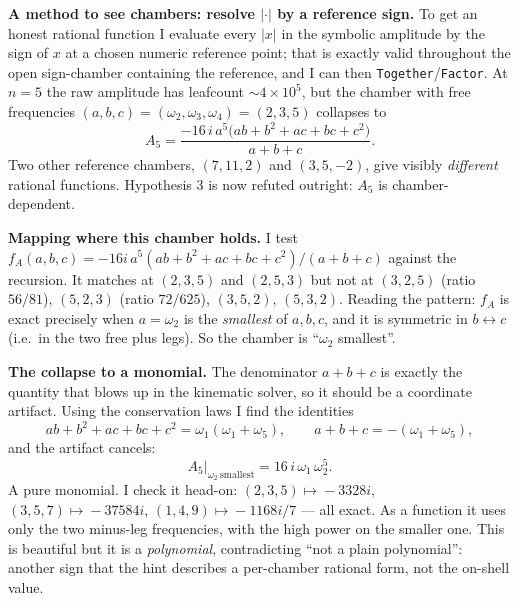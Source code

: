 \documentclass[11pt]{article}
\begin{document}
\medskip
\noindent\textbf{A method to see chambers: resolve $|\cdot|$ by a reference sign.}
To get an honest rational function I evaluate every $|x|$ in the symbolic amplitude by the
sign of $x$ at a chosen numeric reference point; that is exactly valid throughout the open
sign-chamber containing the reference, and I can then \texttt{Together}/\texttt{Factor}. At
$n=5$ the raw amplitude has leafcount $\sim4\times10^5$, but the chamber with free
frequencies $(a,b,c)=(\omega_2,\omega_3,\omega_4)=(2,3,5)$ collapses to
\[
A_5=\frac{-16\,i\,a^5\bigl(ab+b^2+ac+bc+c^2\bigr)}{a+b+c}.
\]
Two other reference chambers, $(7,11,2)$ and $(3,5,-2)$, give visibly \emph{different}
rational functions. Hypothesis 3 is now refuted outright: $A_5$ is chamber-dependent.

\medskip
\noindent\textbf{Mapping where this chamber holds.}
I test $f_A(a,b,c)=-16i\,a^5(ab+b^2+ac+bc+c^2)/(a+b+c)$ against the recursion. It matches at
$(2,3,5)$ and $(2,5,3)$ but not at $(3,2,5)$ (ratio $56/81$), $(5,2,3)$ (ratio $72/625$),
$(3,5,2)$, $(5,3,2)$. Reading the pattern: $f_A$ is exact precisely when $a=\omega_2$ is the
\emph{smallest} of $a,b,c$, and it is symmetric in $b\leftrightarrow c$ (i.e.\ in the two
free plus legs). So the chamber is ``$\omega_2$ smallest''.

\medskip
\noindent\textbf{The collapse to a monomial.}
The denominator $a+b+c$ is exactly the quantity that blows up in the kinematic solver, so it
should be a coordinate artifact. Using the conservation laws I find the identities
\[
ab+b^2+ac+bc+c^2=\omega_1(\omega_1+\omega_5),\qquad a+b+c=-(\omega_1+\omega_5),
\]
and the artifact cancels:
\[
A_5\big|_{\omega_2\ \mathrm{smallest}}=16\,i\,\omega_1\,\omega_2^5 .
\]
A pure monomial. I check it head-on: $(2,3,5)\!\mapsto\!-3328i$, $(3,5,7)\!\mapsto\!-37584i$,
$(1,4,9)\!\mapsto\!-1168i/7$ --- all exact. As a function it uses only the two minus-leg
frequencies, with the high power on the smaller one. This is beautiful but it is a
\emph{polynomial}, contradicting ``not a plain polynomial'': another sign that the hint
describes a per-chamber rational form, not the on-shell value.
\end{document}
